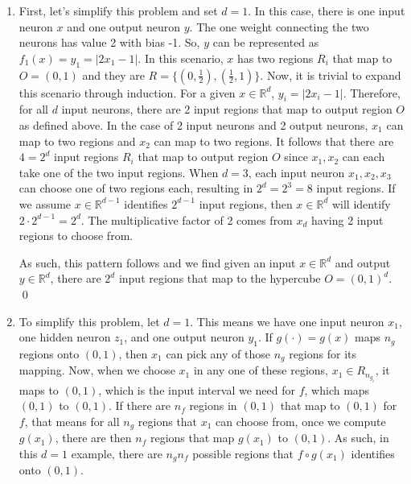 \documentclass[11pt,english]{article}
\begin{document}
\begin{enumerate}
	\item First, let's simplify this problem and set $d = 1$. In this case, there is one input neuron $x$ and one output neuron $y$. The one weight connecting the two neurons has value 2 with bias -1. So, $y$ can be represented as $f_1(x) = y_1 = |2x_1 - 1|$. In this scenario, $x$ has two regions $R_i$ that map to $O = (0, 1)$ and they are $R = \{(0, \frac{1}{2}), (\frac{1}{2}, 1)\}$. Now, it is trivial to expand this scenario through induction. For a given $x \in \mathbb{R}^d$, $y_i = |2x_i - 1|$. Therefore, for all $d$ input neurons, there are 2 input regions that map to output region $O$ as defined above. In the case of 2 input neurons and 2 output neurons, $x_1$ can map to two regions and $x_2$ can map to two regions. It follows that there are $4 = 2^d$ input regions $R_i$ that map to output region $O$ since $x_1, x_2$ can each take one of the two input regions. When $d = 3$, each input neuron $x_1, x_2, x_3$ can choose one of two regions each, resulting in $2^d = 2^3 = 8$ input regions. If we assume $x \in \mathbb{R}^{d-1}$ identifies $2^{d-1}$ input regions, then $x \in \mathbb{R}^d$ will identify $2\cdot 2^{d-1} = 2^d$. The multiplicative factor of 2 comes from $x_d$ having 2 input regions to choose from. 
	
	As such, this pattern follows and we find given an input $x \in \mathbb{R}^d$ and output $y \in \mathbb{R}^d$, there are $2^d$ input regions that map to the hypercube $O = (0, 1)^d$.  \qed \pagebreak
	\item To simplify this problem, let $d = 1$. This means we have one input neuron $x_1$, one hidden neuron $z_1$, and one output neuron $y_1$. If $g(\cdot) = g(x)$ maps $n_g$ regions onto $(0, 1)$, then $x_1$ can pick any of those $n_g$ regions for its mapping. Now, when we choose $x_1$ in any one of these regions, $x_1 \in R_{n_{g_i}}$, it maps to $(0, 1)$, which is the input interval we need for $f$, which maps $(0, 1)$ to $(0, 1)$. If there are $n_f$ regions in $(0, 1)$ that map to $(0, 1)$ for $f$, that means for all $n_g$ regions that $x_1$ can choose from, once we compute $g(x_1)$, there are then $n_f$ regions that map $g(x_1)$ to $(0, 1)$. As such, in this $d = 1$ example, there are $n_gn_f$ possible regions that $f \circ g(x_1)$ identifies onto $(0, 1)$. 
	

\end{enumerate}
\end{document}
